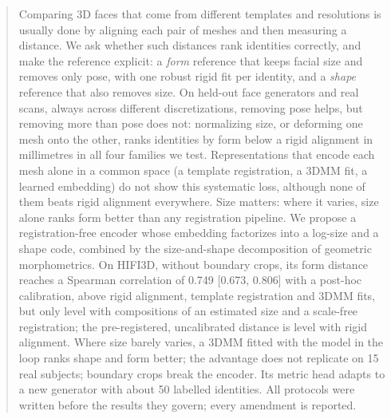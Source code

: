 \documentclass[10pt,twocolumn,letterpaper]{article}
\begin{document}
\begin{abstract}
Comparing 3D faces that come from different templates and resolutions is usually done by aligning each pair of meshes and then measuring a distance. We ask whether such distances rank identities correctly, and make the reference explicit: a \emph{form} reference that keeps facial size and removes only pose, with one robust rigid fit per identity, and a \emph{shape} reference that also removes size. On held-out face generators and real scans, always across different discretizations, removing pose helps, but removing more than pose does not: normalizing size, or deforming one mesh onto the other, ranks identities by form below a rigid alignment in millimetres in all four families we test. Representations that encode each mesh alone in a common space (a template registration, a 3DMM fit, a learned embedding) do not show this systematic loss, although none of them beats rigid alignment everywhere. Size matters: where it varies, size alone ranks form better than any registration pipeline. We propose a registration-free encoder whose embedding factorizes into a log-size and a shape code, combined by the size-and-shape decomposition of geometric morphometrics. On HIFI3D, without boundary crops, its form distance reaches a Spearman correlation of 0.749 [0.673, 0.806] with a post-hoc calibration, above rigid alignment, template registration and 3DMM fits, but only level with compositions of an estimated size and a scale-free registration; the pre-registered, uncalibrated distance is level with rigid alignment. Where size barely varies, a 3DMM fitted with the model in the loop ranks shape and form better; the advantage does not replicate on 15 real subjects; boundary crops break the encoder. Its metric head adapts to a new generator with about 50 labelled identities. All protocols were written before the results they govern; every amendment is reported.
\end{abstract}
\end{document}
